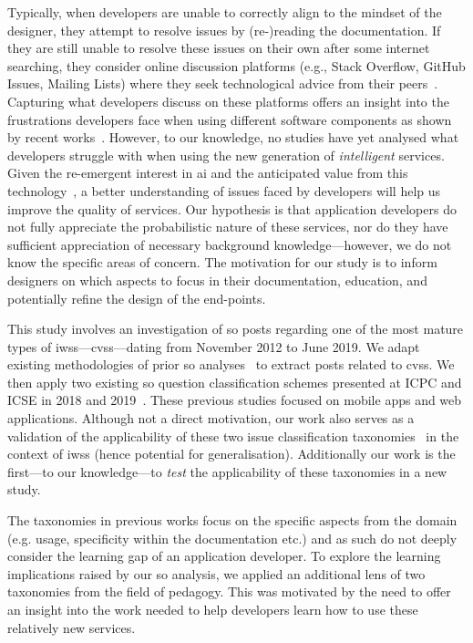 Typically, when developers are unable to correctly align to the mindset of the  designer, they attempt to resolve issues by \mbox{(re-)reading} the  documentation. If they are still unable to resolve these issues on their own after some internet searching, they consider online discussion platforms (e.g., Stack Overflow, GitHub Issues, Mailing Lists) where they seek technological advice from their peers~\citep{Aghajani:2019bo}.
Capturing what developers discuss on these platforms offers an insight into the frustrations developers face when using different software components as shown by recent works~\citep{Rosen:2016uk,Beyer:2014ec,Kavaler:2013uh,Wang:2013ub,Stevens:2013vf}.
However, to our knowledge, no studies have yet analysed what developers struggle with when using the new generation of \textit{intelligent} services. Given the re-emergent interest in \gls{ai} and the anticipated value from this technology~\citep{LoGiudice:2016wf}, a better understanding of issues faced by developers will help us improve the quality of services. Our hypothesis is that application developers do not fully appreciate the probabilistic nature of these services, nor do they have sufficient appreciation of necessary background knowledge---however, we do not know the specific areas of concern. The motivation for our study is to inform  designers on which aspects to focus in their documentation, education, and potentially refine the design of the end-points.

This study involves an investigation of \NumPostsCategorised{} \gls{so} posts regarding one of the most mature types of \glspl{iws}---\glspl{cvs}---dating from November 2012 to June 2019. We adapt existing methodologies of prior \gls{so} analyses~\citep{Tahir:2018ks, Beyer:2014ec} to extract posts related to \glspl{cvs}. We then apply two existing \gls{so} question classification schemes presented at ICPC and ICSE in 2018 and 2019~\citep{Aghajani:2019bo,Beyer:2018fm}. These previous studies focused on mobile apps and web applications. Although not a direct motivation, our work also serves as a validation of the applicability of these two issue classification taxonomies~\citep{Aghajani:2019bo,Beyer:2018fm} in the context of \glspl{iws} (hence potential for generalisation). Additionally our work is the first---to our knowledge---to \textit{test} the applicability of these taxonomies in a new study.

The taxonomies in previous works focus on the specific aspects from the domain (e.g.  usage, specificity within the documentation etc.) and as such do not deeply consider the learning gap of an application developer.
To explore the  learning implications raised by our \gls{so} analysis, we applied an additional lens of two taxonomies from the field of pedagogy. This was motivated by the need to offer an insight into the work needed to help developers learn how to use these relatively new services.

